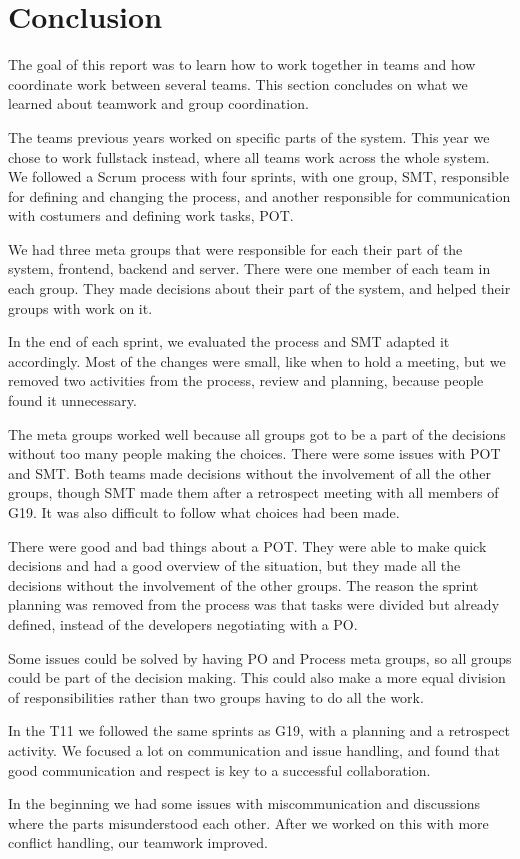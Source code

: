 \section{Conclusion}
The goal of this report was to learn how to work together in teams and how coordinate work between several teams. This section concludes on what we learned about teamwork and group coordination. 

The teams previous years worked on specific parts of the system. This year we chose to work fullstack instead, where all teams work across the whole system. We followed a Scrum process with four sprints, with one group, \gls{SMT}, responsible for defining and changing the process, and another responsible for communication with costumers and defining work tasks, \gls{POT}.

We had three meta groups that were responsible for each their part of the system, frontend, backend and server. There were one member of each team in each group. They made decisions about their part of the system, and helped their groups with work on it. 

In the end of each sprint, we evaluated the process and \gls{SMT} adapted it accordingly. Most of the changes were small, like when to hold a meeting, but we removed two activities from the process, review and planning, because people found it unnecessary. 

The meta groups worked well because all groups got to be a part of the decisions without too many people making the choices. There were some issues with \gls{POT} and \gls{SMT}. Both teams made decisions without the involvement of all the other groups, though \gls{SMT} made them after a retrospect meeting with all members of \gls{G19}. It was also difficult to follow what choices had been made.

There were good and bad things about a \gls{POT}. They were able to make quick decisions and had a good overview of the situation, but they made all the decisions without the involvement of the other groups. The reason the sprint planning was removed from the process was that tasks were divided but already defined, instead of the developers negotiating with a PO. 

Some issues could be solved by having PO and Process meta groups, so all groups could be part of the decision making. This could also make a more equal division of responsibilities rather than two groups having to do all the work.

In the \gls{T11} we followed the same sprints as \gls{G19}, with a planning and a retrospect activity. We focused a lot on communication and issue handling, and found that good communication and respect is key to a successful collaboration. 

In the beginning we had some issues with miscommunication and discussions where the parts misunderstood each other. After we worked on this with more conflict handling, our teamwork improved. 
